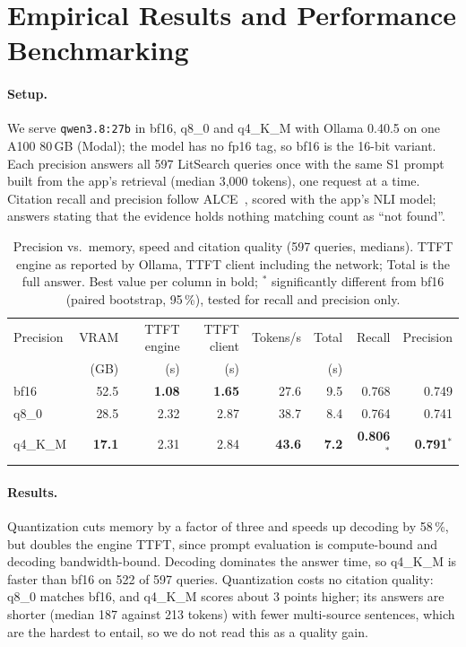 \section{Empirical Results and Performance Benchmarking}
\label{sec:benchmarks}

\paragraph{Setup.}
We serve \texttt{qwen3.8:27b} in bf16, q8\_0 and q4\_K\_M with Ollama 0.40.5 on one A100 80\,GB (Modal); the model has no fp16 tag, so bf16 is the 16-bit variant.
Each precision answers all 597 LitSearch queries once with the same S1 prompt built from the app's retrieval (median 3{,}000 tokens), one request at a time.
Citation recall and precision follow ALCE~\cite{gao2023alce}, scored with the app's NLI model; answers stating that the evidence holds nothing matching count as ``not found''.

\begin{table}[ht]
\centering
\caption{Precision vs.\ memory, speed and citation quality (597 queries, medians). TTFT engine as reported by Ollama, TTFT client including the network; Total is the full answer. Best value per column in bold; $^{*}$ significantly different from bf16 (paired bootstrap, 95\,\%), tested for recall and precision only.}
\label{tab:precision}
\small
\setlength{\tabcolsep}{4pt}
\begin{tabular}{lrrrrrrr}
\toprule
Precision & VRAM & TTFT engine & TTFT client & Tokens/s & Total & Recall & Precision \\
 & (GB) & (s) & (s) & & (s) & & \\
\midrule
bf16     & 52.5 & \textbf{1.08} & \textbf{1.65} & 27.6 & 9.5 & 0.768 & 0.749 \\
q8\_0    & 28.5 & 2.32 & 2.87 & 38.7 & 8.4 & 0.764 & 0.741 \\
q4\_K\_M & \textbf{17.1} & 2.31 & 2.84 & \textbf{43.6} & \textbf{7.2} & \textbf{0.806}$^{*}$ & \textbf{0.791}$^{*}$ \\
\bottomrule
\end{tabular}
\end{table}

\paragraph{Results.}
Quantization cuts memory by a factor of three and speeds up decoding by 58\,\%, but doubles the engine TTFT, since prompt evaluation is compute-bound and decoding bandwidth-bound.
Decoding dominates the answer time, so q4\_K\_M is faster than bf16 on 522 of 597 queries.
Quantization costs no citation quality: q8\_0 matches bf16, and q4\_K\_M scores about 3 points higher; its answers are shorter (median 187 against 213 tokens) with fewer multi-source sentences, which are the hardest to entail, so we do not read this as a quality gain.


